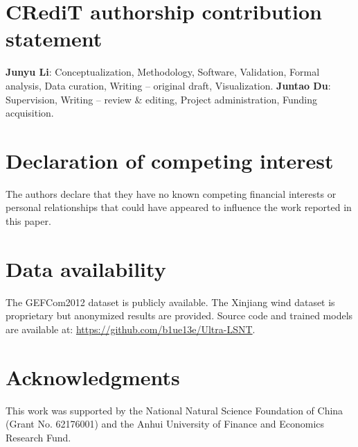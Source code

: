 \documentclass[review,3p,times,draft]{elsarticle}
\begin{document}
\section*{CRediT authorship contribution statement}
\textbf{Junyu Li}: Conceptualization, Methodology, Software, Validation, Formal analysis, Data curation, Writing -- original draft, Visualization. 
\textbf{Juntao Du}: Supervision, Writing -- review \& editing, Project administration, Funding acquisition.

\section*{Declaration of competing interest}
The authors declare that they have no known competing financial interests or personal relationships that could have appeared to influence the work reported in this paper.

\section*{Data availability}
The GEFCom2012 dataset is publicly available. The Xinjiang wind dataset is proprietary but anonymized results are provided. Source code and trained models are available at: \url{https://github.com/b1ue13e/Ultra-LSNT}.

\section*{Acknowledgments}
This work was supported by the National Natural Science Foundation of China (Grant No. 62176001) and the Anhui University of Finance and Economics Research Fund.


\end{document}
